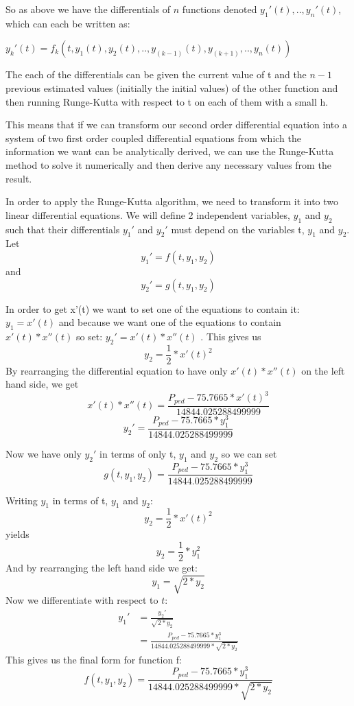 \documentclass[10pt, a4paper]{report}
\begin{document}
So as above we have the differentials of $n$ functions denoted $y_1'(t),..,y_n'(t)$, which can each be written as: \\

{\centering $y_k'(t) = f_k(t,y_1(t),y_2(t),..,y_{(k-1)}(t),y_{(k+1)},..,y_n(t))$ \newline \par}

The each of the differentials can be given the current value of t and the $n - 1$ previous estimated values (initially the initial values) of the other function and then running Runge-Kutta with respect to t on each of them with a small h. \newline \par

This means that if we can transform our second order differential equation into a system of two first order coupled differential equations from which the information we want can be analytically derived, we can use the Runge-Kutta method to solve it numerically and then derive any necessary values from the result. \newline \par

In order to apply the Runge-Kutta algorithm, we need to transform it into two linear differential equations. We will define 2 independent variables, $y_1$ and $y_2$ such that their differentials $y_1'$ and $y_2'$ must depend on the variables t, $y_1$ and $y_2$. Let
$$ y_1' = f( t, y_1, y_2 )$$ and $$y_2' = g( t, y_1, y_2 )$$

In order to get x'(t) we want to set one of the equations to contain it: $y_1 = x'(t)$ and because we want one of the equations to contain $x'(t) * x''(t) $ so set: $y_2' = x'( t ) * x''( t )$ .
This gives us $$ y_{2} = \frac{1}{2} * x'(t)^2 $$
By rearranging the differential equation to have only $ x'( t ) * x''( t )$ on the left hand side, we get
$$ x'( t ) * x''( t ) = \frac{P_{ped} - 75.7665 * x'( t ) ^ 3}{14844.025288499999}$$
$$ y_2' = \frac{P_{ped} - 75.7665 * y_1 ^ 3}{14844.025288499999}$$

Now we have only $y_2'$ in terms of only t, $y_1$ and $y_2$ so we can set $$ g( t, y_1, y_2 ) = \frac{P_{ped} - 75.7665 * y_1 ^ 3}{14844.025288499999}$$

Writing $y_1$ in terms of t, $y_1$ and $y_2$: $$y_2 = \frac{1}{2} * x'(t)^2$$ yields $$y_2 = \frac{1}{2} * y_1^2$$
And by rearranging the left hand side we get:
$$y_1 = \sqrt{2 * y_2}$$
Now we differentiate with respect to $t$:
\begin{align*}
y_1' & = \frac{y_2'}{\sqrt{2 * y_2}}\\
& = \frac{P_{ped} - 75.7665 * y_1 ^ 3}{14844.025288499999 * \sqrt{2 * y_2}}
\end{align*}
This gives us the final form for function f:
$$ f(t, y_1, y_2) = \frac{P_{ped} - 75.7665 * y_1 ^ 3}{14844.025288499999 * \sqrt{2 * y_2}}$$
\end{document}

